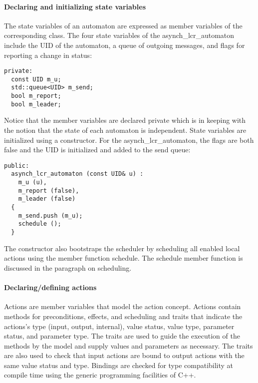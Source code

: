 \paragraph*{Declaring and initializing state variables}
The state variables of an automaton are expressed as member variables of the corresponding class.
The four state variables of the asynch\_lcr\_automaton include the UID of the automaton, a queue of outgoing messages, and flags for reporting a change in status:
\ifjournal
\begin{lstlisting}
private:
  const UID m_u;
  std::queue<UID> m_send;
  bool m_report;
  bool m_leader;
\end{lstlisting}
\fi
Notice that the member variables are declared private which is in keeping with the notion that the state of each automaton is independent.
State variables are initialized using a constructor.
For the asynch\_lcr\_automaton, the flags are both false and the UID is initialized and added to the send queue:
\ifjournal
\begin{lstlisting}
public:
  asynch_lcr_automaton (const UID& u) :
    m_u (u),
    m_report (false),
    m_leader (false)
  {
    m_send.push (m_u);
    schedule ();
  }
\end{lstlisting}
\fi
The constructor also bootstraps the scheduler by scheduling all enabled local actions using the member function schedule.
The schedule member function is discussed in the paragraph on scheduling.

\paragraph*{Declaring/defining actions}
Actions are member variables that model the action concept.
Actions contain methods for preconditions, effects, and scheduling and traits that indicate the actions's type (input, output, internal), value status, value type, parameter status, and parameter type.
The traits are used to guide the execution of the methods by the model and supply values and parameters as necessary.
The traits are also used to check that input actions are bound to output actions with the same value status and type.
Bindings are checked for type compatibility at compile time using the generic programming facilities of C++.

